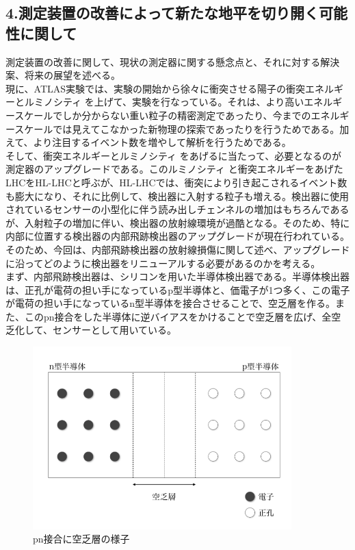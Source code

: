 \documentclass{jreport}
\begin{document}
\subsection*{4.測定装置の改善によって新たな地平を切り開く可能性に関して}
\noindent
測定装置の改善に関して、現状の測定器に関する懸念点と、それに対する解決案、将来の展望を述べる。\\
現に、ATLAS実験では、実験の開始から徐々に衝突させる陽子の衝突エネルギーとルミノシティ を上げて、実験を行なっている。それは、より高いエネルギースケールでしか分からない重い粒子の精密測定であったり、今までのエネルギースケールでは見えてこなかった新物理の探索であったりを行うためである。加えて、より注目するイベント数を増やして解析を行うためである。\\
そして、衝突エネルギーとルミノシティ をあげるに当たって、必要となるのが測定器のアップグレードである。このルミノシティ と衝突エネルギーをあげたLHCをHL-LHCと呼ぶが、HL-LHCでは、衝突により引き起こされるイベント数も膨大になり、それに比例して、検出器に入射する粒子も増える。検出器に使用されているセンサーの小型化に伴う読み出しチェンネルの増加はもちろんであるが、入射粒子の増加に伴い、検出器の放射線環境が過酷となる。そのため、特に内部に位置する検出器の内部飛跡検出器のアップグレードが現在行われている。\\
そのため、今回は、内部飛跡検出器の放射線損傷に関して述べ、アップグレードに沿ってどのように検出器をリニューアルする必要があるのかを考える。\\
まず、内部飛跡検出器は、シリコンを用いた半導体検出器である。半導体検出器は、正孔が電荷の担い手になっているp型半導体と、価電子が1つ多く、この電子が電荷の担い手になっているn型半導体を接合させることで、空乏層を作る。また、このpn接合をした半導体に逆バイアスをかけることで空乏層を広げ、全空乏化して、センサーとして用いている。\\
\begin{figure}[htbp]
	\begin{center}
	\includegraphics[width=100mm]{silicon.png}
	\end{center}
	\caption{pn接合に空乏層の様子}
	\label{fig:six}
\end{figure}
\end{document}
